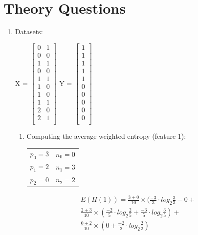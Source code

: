 \documentclass[12pt]{article}
\begin{document}
\maketitle

\section{Theory Questions}

\begin{enumerate}
	\item Datasets:\\
\begin{center}
X = 
$
 \begin{bmatrix}
	0 & 1\\
	0 & 0\\	
	1 & 1\\
	0 & 0\\
	1 & 1\\
	1 & 0\\
	1 & 0\\
	1 & 1\\
	2 & 0\\
	2 & 1\\
	
\end{bmatrix}
$
Y = 
$
 \begin{bmatrix}
	1\\
	1\\
	1\\
	1\\
	1\\
	0\\
	0\\
	0\\
	0\\
	0\\
\end{bmatrix}
$
\end{center}

\begin{enumerate}
	
	\item Computing the average weighted entropy (feature 1):\\

		\begin{tabular}{ c c}
			$p_0 = 3$ & $n_0 = 0$\\ 
			$p_1 = 2$ & $n_1 = 3$\\  
			$p_2 = 0$ & $n_2 = 2$    
		\end{tabular}
	
		
		\begin{equation}
			\begin{split}
				E(H(1)) = \frac {3+0}{10} \times (\frac{-3}{3} \cdot log_2 \frac{3}{3} - 0 +\\
				\frac {2+3}{10} \times (\frac{-2}{5} \cdot log_2 \frac{2}{5} + \frac{-3}{5} \cdot log_2 \frac{3}{5}) +\\
				\frac {0+2}{10} \times (0 + \frac{-2}{2} \cdot log_2 \frac{2}{2})
			\end{split}
		\end{equation}
	

\end{enumerate}
\end{enumerate}
\end{document}
